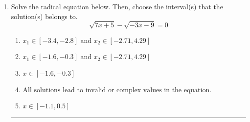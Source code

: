\documentclass[14pt]{extbook}
\newcommand{\litem}[1]{\item#1\hspace*{-1cm}\rule{\textwidth}{0.4pt}}
\begin{document}
\begin{enumerate}
{\begin{enumerate}[label=\Alph*.]
\end{enumerate} }
\litem{
Solve the radical equation below. Then, choose the interval(s) that the solution(s) belongs to.\[ \sqrt{7 x + 5} - \sqrt{-3 x - 9} = 0 \]\begin{enumerate}[label=\Alph*.]
\item \( x_1 \in [-3.4, -2.8] \text{ and } x_2 \in [-2.71,4.29] \)
\item \( x_1 \in [-1.6, -0.3] \text{ and } x_2 \in [-2.71,4.29] \)
\item \( x \in [-1.6,-0.3] \)
\item \( \text{All solutions lead to invalid or complex values in the equation.} \)
\item \( x \in [-1.1,0.5] \)

\end{enumerate} }
\end{enumerate}
\end{document}
